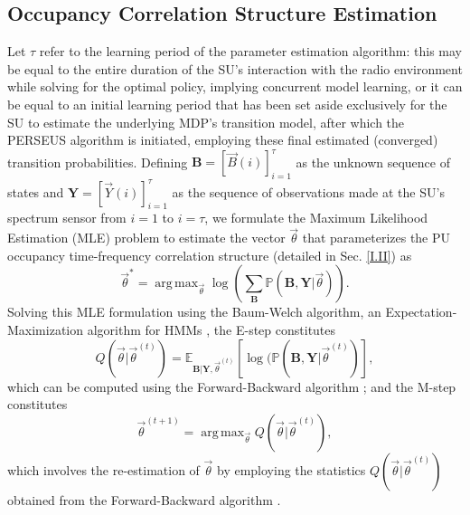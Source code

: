 \documentclass[10pt, twocolumn]{IEEEtran}
\DeclareMathOperator*{\argmax}{arg\,max}
\begin{document}
\subsection{Occupancy Correlation Structure Estimation}\label{II.I}
Let $\tau$ refer to the learning period of the parameter estimation algorithm: this may be equal to the entire duration of the SU's interaction with the radio environment while solving for the optimal policy, implying concurrent model learning, or it can  be equal to an initial learning period that has been set aside exclusively for the SU to estimate the underlying MDP's transition model, after which the PERSEUS algorithm is initiated, employing these final estimated (converged) transition probabilities. Defining $\mathbf{B}{=}[\vec{B}(i)]_{i{=}1}^{\tau}$ as the unknown sequence of states and $\mathbf{Y}{=}[\vec{Y}(i)]_{i{=}1}^{\tau}$ as the sequence of observations made at the SU's spectrum sensor from $i{=}1$ to $i{=}\tau$, we formulate the Maximum Likelihood Estimation (MLE) problem to estimate the vector $\vec{\theta}$ that parameterizes the PU occupancy time-frequency correlation structure (detailed in Sec. \ref{I.II}) as
\begin{equation}\label{19}
    \vec{\theta}^{*}=\argmax_{\vec{\theta}}\log{\left(\sum_{\mathbf{B}}\mathbb{P}(\mathbf{B},\mathbf{Y}|\vec{\theta})\right)}.
\end{equation}
Solving this MLE formulation using the Baum-Welch algorithm, an Expectation-Maximization algorithm for HMMs \cite{Baum_1966}, the E-step constitutes
\begin{equation}\label{20}
    Q(\vec{\theta}|\vec{\theta}^{(t)})=\mathbb{E}_{\mathbf{B}|\mathbf{Y},\vec{\theta}^{(t)}}\left[\log{(\mathbb{P}(\mathbf{B},\mathbf{Y}|\vec{\theta}^{(t)})}\right],
\end{equation}
which can be computed using the Forward-Backward algorithm \cite{Rabiner_1989}; and the M-step constitutes
\begin{equation}\label{21}
    \vec{\theta}^{(t+1)}=\argmax_{\vec{\theta}}Q(\vec{\theta}|\vec{\theta}^{(t)}),
\end{equation}
which involves the re-estimation of $\vec{\theta}$ by employing the statistics $Q(\vec{\theta}|\vec{\theta}^{(t)})$ obtained from the Forward-Backward algorithm \cite{Rabiner_1989}.
\vspace{-5mm}
\end{document}
